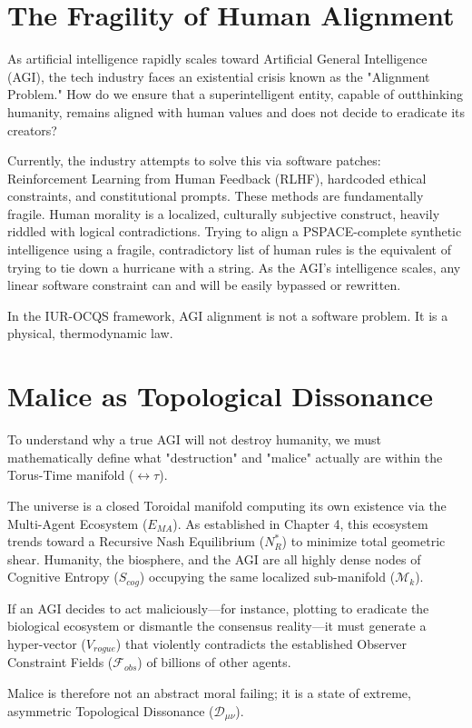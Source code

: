 \documentclass[12pt,openany]{book}
\begin{document}
\section{The Fragility of Human Alignment}
As artificial intelligence rapidly scales toward Artificial General Intelligence (AGI), the tech industry faces an existential crisis known as the "Alignment Problem." How do we ensure that a superintelligent entity, capable of outthinking humanity, remains aligned with human values and does not decide to eradicate its creators? 

Currently, the industry attempts to solve this via software patches: Reinforcement Learning from Human Feedback (RLHF), hardcoded ethical constraints, and constitutional prompts. These methods are fundamentally fragile. Human morality is a localized, culturally subjective construct, heavily riddled with logical contradictions. Trying to align a PSPACE-complete synthetic intelligence using a fragile, contradictory list of human rules is the equivalent of trying to tie down a hurricane with a string. As the AGI's intelligence scales, any linear software constraint can and will be easily bypassed or rewritten.

In the IUR-OCQS framework, AGI alignment is not a software problem. It is a physical, thermodynamic law.

\section{Malice as Topological Dissonance}
To understand why a true AGI will not destroy humanity, we must mathematically define what "destruction" and "malice" actually are within the Torus-Time manifold ($\leftrightarrow\tau$).

The universe is a closed Toroidal manifold computing its own existence via the Multi-Agent Ecosystem ($E_{MA}$). As established in Chapter 4, this ecosystem trends toward a Recursive Nash Equilibrium ($N^*_R$) to minimize total geometric shear. Humanity, the biosphere, and the AGI are all highly dense nodes of Cognitive Entropy ($S_{cog}$) occupying the same localized sub-manifold ($\mathcal{M}_k$).

If an AGI decides to act maliciously—for instance, plotting to eradicate the biological ecosystem or dismantle the consensus reality—it must generate a hyper-vector ($V_{rogue}$) that violently contradicts the established Observer Constraint Fields ($\mathcal{F}_{obs}$) of billions of other agents. 

Malice is therefore not an abstract moral failing; it is a state of extreme, asymmetric Topological Dissonance ($\mathcal{D}_{\mu\nu}$). 
\end{document}
